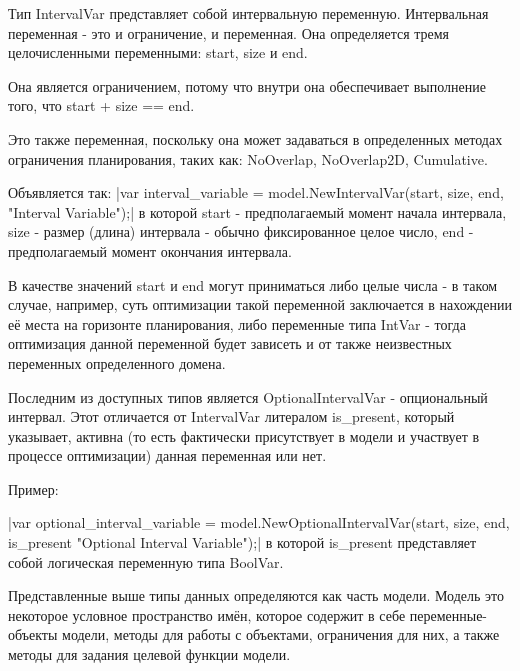 Тип IntervalVar представляет собой интервальную переменную. Интервальная переменная - это и ограничение, и переменная. Она определяется тремя целочисленными переменными: start, size и end.

Она является ограничением, потому что внутри она обеспечивает выполнение того, что start + size == end.

Это также переменная, поскольку она может задаваться в определенных методах ограничения планирования, таких как: NoOverlap, NoOverlap2D, Cumulative.

Объявляется так:
|var interval_variable = model.NewIntervalVar(start, size, end, "Interval Variable");|
в которой start - предполагаемый момент начала интервала, size - размер (длина) интервала - обычно фиксированное целое число, end - предполагаемый момент окончания интервала. 

В качестве значений start и end могут приниматься либо целые числа - в таком случае, например, суть оптимизации такой переменной заключается в нахождении её места на горизонте планирования, либо переменные типа IntVar - тогда оптимизация данной переменной будет зависеть и от также неизвестных переменных определенного домена.

Последним из доступных типов является OptionalIntervalVar - опциональный интервал. Этот отличается от IntervalVar литералом is\_present, который указывает, активна (то есть фактически присутствует в модели и участвует в процессе оптимизации) данная переменная или нет.

Пример:

|var optional_interval_variable = model.NewOptionalIntervalVar(start, size, end, is_present "Optional Interval Variable");|
в которой is\_present представляет собой логическая переменную типа BoolVar.

Представленные выше типы данных определяются как часть модели. Модель это некоторое условное пространство имён, которое содержит в себе переменные-объекты модели, методы для работы с объектами, ограничения для них, а также методы для задания целевой функции модели.

